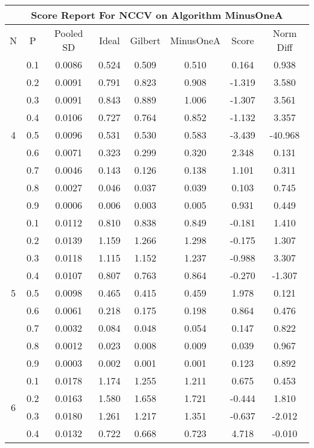 \documentclass[11pt,a4paper]{report}
\begin{document}
\begin{longtable}{ | c | c || c | c | c | c | c | c | }
\hline
\multicolumn{8}{|c|}{ Score Report For NCCV on Algorithm MinusOneA} \\
\hline
N & P & Pooled SD &  Ideal &  Gilbert & MinusOneA  & Score & Norm Diff \\
 \hline
 \hline
 \endhead
\multirow{9}{*}{4} & 0.1 & 0.0086 & 0.524 & 0.509 & 0.510 & 0.164 & 0.938 \\
 & 0.2 & 0.0091 & 0.791 & 0.823 & 0.908 & -1.319 & 3.580 \\
 & 0.3 & 0.0091 & 0.843 & 0.889 & 1.006 & -1.307 & 3.561 \\
 & 0.4 & 0.0106 & 0.727 & 0.764 & 0.852 & -1.132 & 3.357 \\
 & 0.5 & 0.0096 & 0.531 & 0.530 & 0.583 & -3.439 & -40.968 \\
 & 0.6 & 0.0071 & 0.323 & 0.299 & 0.320 & 2.348 & 0.131 \\
 & 0.7 & 0.0046 & 0.143 & 0.126 & 0.138 & 1.101 & 0.311 \\
 & 0.8 & 0.0027 & 0.046 & 0.037 & 0.039 & 0.103 & 0.745 \\
 & 0.9 & 0.0006 & 0.006 & 0.003 & 0.005 & 0.931 & 0.449 \\
 \hline
\multirow{9}{*}{5} & 0.1 & 0.0112 & 0.810 & 0.838 & 0.849 & -0.181 & 1.410 \\
 & 0.2 & 0.0139 & 1.159 & 1.266 & 1.298 & -0.175 & 1.307 \\
 & 0.3 & 0.0118 & 1.115 & 1.152 & 1.237 & -0.988 & 3.307 \\
 & 0.4 & 0.0107 & 0.807 & 0.763 & 0.864 & -0.270 & -1.307 \\
 & 0.5 & 0.0098 & 0.465 & 0.415 & 0.459 & 1.978 & 0.121 \\
 & 0.6 & 0.0061 & 0.218 & 0.175 & 0.198 & 0.864 & 0.476 \\
 & 0.7 & 0.0032 & 0.084 & 0.048 & 0.054 & 0.147 & 0.822 \\
 & 0.8 & 0.0012 & 0.023 & 0.008 & 0.009 & 0.039 & 0.967 \\
 & 0.9 & 0.0003 & 0.002 & 0.001 & 0.001 & 0.123 & 0.892 \\
 \hline
\multirow{9}{*}{6} & 0.1 & 0.0178 & 1.174 & 1.255 & 1.211 & 0.675 & 0.453 \\
 & 0.2 & 0.0163 & 1.580 & 1.658 & 1.721 & -0.444 & 1.810 \\
 & 0.3 & 0.0180 & 1.261 & 1.217 & 1.351 & -0.637 & -2.012 \\
 & 0.4 & 0.0132 & 0.722 & 0.668 & 0.723 & 4.718 & -0.010 \\

\end{longtable}
\end{document}
